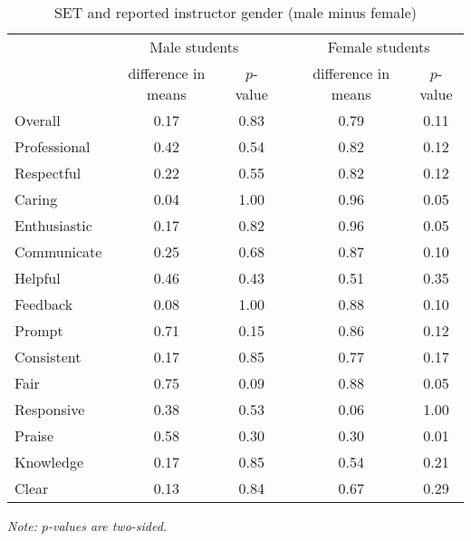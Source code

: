 \documentclass[12pt]{article}
\begin{document}
\begin{table}[htbp]
  \centering
  \footnotesize 
  \caption{SET and reported instructor gender (male minus female)}
    \begin{tabular}{lccccc}
    \toprule 
          & \multicolumn{2}{c}{Male students}  &  & \multicolumn{2}{c}{Female students} \\
                          & difference in means  &  $p$-value &  & difference in means & $p$-value    \\
                          
   \midrule
    Overall &		0.17	& 0.83 & & 0.79    & 0.11   \\
    Professional &	0.42	& 0.54 & & 0.82    & 0.12   \\
    Respectful  & 	0.22	& 0.55 & & 0.82    & 0.12   \\
    Caring & 		0.04	& 1.00 & & 0.96    & 0.05  \\
    Enthusiastic &	0.17	& 0.82 & & 0.96    & 0.05   \\
    Communicate &	0.25	& 0.68 & & 0.87    & 0.10  \\
    Helpful &		0.46	& 0.43 & & 0.51    & 0.35   \\
    Feedback &		0.08	& 1.00 & & 0.88    & 0.10   \\
    Prompt &		0.71	& 0.15 & & 0.86    & 0.12   \\
    Consistent &		0.17	& 0.85 & & 0.77    & 0.17   \\
    Fair &			0.75	& 0.09 & & 0.88    & 0.05  \\
    Responsive & 	0.38	& 0.53 & & 0.06    & 1.00  \\
    Praise & 		0.58	& 0.30 & & 0.30    & 0.01  \\
    Knowledge &		0.17	& 0.85 & & 0.54    & 0.21  \\
    Clear &			0.13	& 0.84 & & 0.67    & 0.29  \\
    \bottomrule
    \end{tabular}%
 \label{tab:macnell2}%

  \textit{Note: $p$-values are two-sided.}
\end{table}%
\normalsize
\end{document}
